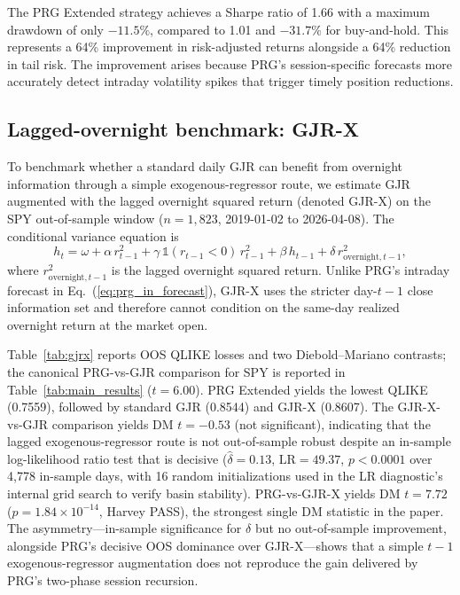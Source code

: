 \documentclass[11pt,a4paper]{article}
\begin{document}
The PRG Extended strategy achieves a Sharpe ratio of 1.66 with a maximum drawdown of only $-11.5\%$, compared to 1.01 and $-31.7\%$ for buy-and-hold. This represents a 64\% improvement in risk-adjusted returns alongside a 64\% reduction in tail risk. The improvement arises because PRG's session-specific forecasts more accurately detect intraday volatility spikes that trigger timely position reductions.

\subsection{Lagged-overnight benchmark: GJR-X}
\label{sec:gjrx}

To benchmark whether a standard daily GJR can benefit from overnight information through a simple exogenous-regressor route, we estimate GJR augmented with the lagged overnight squared return (denoted GJR-X) on the SPY out-of-sample window ($n=1{,}823$, 2019-01-02 to 2026-04-08). The conditional variance equation is
\begin{equation}
    h_t = \omega + \alpha\, r^2_{t-1} + \gamma\, \mathbb{1}(r_{t-1} < 0)\, r^2_{t-1} + \beta\, h_{t-1} + \delta\, r^2_{\text{overnight},t-1},
    \label{eq:gjrx}
\end{equation}
where $r^2_{\text{overnight},t-1}$ is the lagged overnight squared return. Unlike PRG's intraday forecast in Eq.~(\ref{eq:prg_in_forecast}), GJR-X uses the stricter day-$t{-}1$ close information set and therefore cannot condition on the same-day realized overnight return at the market open.

Table~\ref{tab:gjrx} reports OOS QLIKE losses and two Diebold--Mariano contrasts; the canonical PRG-vs-GJR comparison for SPY is reported in Table~\ref{tab:main_results} ($t = 6.00$). PRG Extended yields the lowest QLIKE (0.7559), followed by standard GJR (0.8544) and GJR-X (0.8607). The GJR-X-vs-GJR comparison yields DM $t = -0.53$ (not significant), indicating that the lagged exogenous-regressor route is not out-of-sample robust despite an in-sample log-likelihood ratio test that is decisive ($\hat{\delta} = 0.13$, $\mathrm{LR} = 49.37$, $p < 0.0001$ over 4{,}778 in-sample days, with 16 random initializations used in the LR diagnostic's internal grid search to verify basin stability). PRG-vs-GJR-X yields DM $t = 7.72$ ($p = 1.84 \times 10^{-14}$, Harvey PASS), the strongest single DM statistic in the paper. The asymmetry---in-sample significance for $\delta$ but no out-of-sample improvement, alongside PRG's decisive OOS dominance over GJR-X---shows that a simple $t{-}1$ exogenous-regressor augmentation does not reproduce the gain delivered by PRG's two-phase session recursion.
\end{document}

